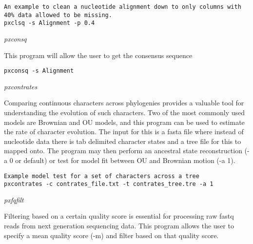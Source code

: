 \documentclass[12pt,letterpaper]{article}
\renewcommand{\subsection}[1]{%
\bigskip
\begin{center}
\begin{large}
\normalfont\itshape #1
\end{large}
\end{center}}
\begin{document}
\begin{flushleft}
\begin{verbatim}
An example to clean a nucleotide alignment down to only columns with 40% data allowed to be missing.
pxclsq -s Alignment -p 0.4
\end{verbatim}
\end{flushleft}

\subsection{pxconsq}

This program will allow the user to get the consensus sequence 

\begin{flushleft}
\begin{verbatim}
pxconsq -s Alignment
\end{verbatim}
\end{flushleft}

\subsection{pxcontrates}

Comparing continuous characters across phylogenies provides a valuable tool for understanding the evolution of such characters. Two of the most commonly used models are Brownian and OU models, and this program can be used to estimate the rate of character evolution. The input for this is a fasta file where instead of nucleotide data there is tab delimited character states and a tree file for this to mapped onto. The program may then perform an ancestral state reconstruction (-a 0 or default) or test for model fit between OU and Brownian motion (-a 1).

\begin{flushleft}
\begin{verbatim}
Example model test for a set of characters across a tree
pxcontrates -c contrates_file.txt -t contrates_tree.tre -a 1
\end{verbatim}
\end{flushleft}

\subsection{pxfqfilt}

Filtering based on a certain quality score is essential for processing raw fastq reads from next generation sequencing data. This program allows the user to specify a mean quality score (-m) and filter based on that quality score.
\end{document}
